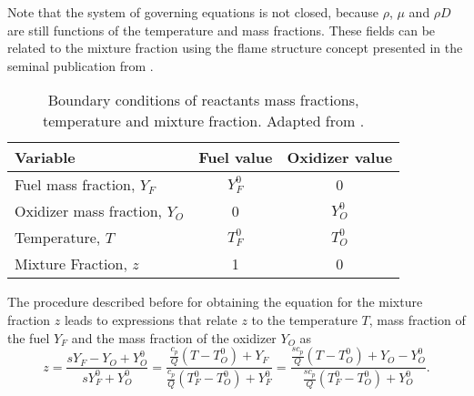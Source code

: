Note that the system of governing equations is not closed, because $\rho$, $\mu$ and $\rho D$ are still functions of the temperature and mass fractions. These fields can be related to the mixture fraction using the flame structure concept presented in the seminal publication from \textcite{burkeDiffusionFlames1928}. 

\begin{table}[]
	\centering
	\begin{tabular}{lcc}
		\hline
		Variable                      & \multicolumn{1}{l}{Fuel value} & \multicolumn{1}{l}{Oxidizer value} \\ \hline
		Fuel mass fraction, $Y_F$     & $Y_F^0$                              & 0                                        \\
		Oxidizer mass fraction, $Y_O$ & 0                                    & $Y_O^0$                                  \\
		Temperature, $T$              & $T_F^0$                              & $T_O^0$                                  \\
		Mixture Fraction, $z$         & 1                                    & 0                                        \\ \hline
	\end{tabular}
	\caption[Boundary conditions of reactants mass fractions, temperature and mixture fraction.]{Boundary conditions of reactants mass fractions, temperature and mixture fraction. Adapted from \textcite{poinsotTheoreticalNumericalCombustion2011}. }
	\label{tab:BCMixtureFraction}
\end{table}

The procedure described before for obtaining the equation for the mixture fraction $z$ leads to expressions that relate $z$ to the temperature $T$, mass fraction of the fuel $Y_F$ and the mass fraction of the oxidizer $Y_O$ as
\begin{equation}
	z = \frac{s Y_F -Y_O +Y_O^0}{sY_F^0+Y_O^0} = \frac{\frac{c_p}{Q}(T-T_O^0)+Y_F }{\frac{c_p}{Q}(T_F^0-T_O^0)+Y_F^0} = \frac{\frac{s c_p}{Q}(T-T_O^0)+Y_O-Y_O^0 }{\frac{sc_p}{Q}(T_F^0-T_O^0)+Y_O^0}. \label{eq:AllMFRelationships}
\end{equation}

